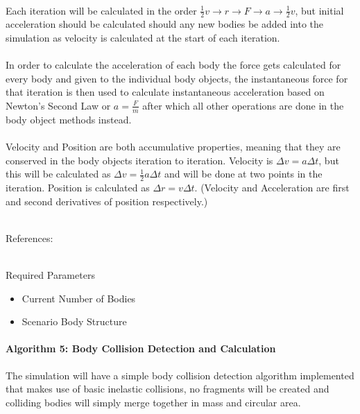 \paragraph{}
Each iteration will be calculated in the order $\frac{1}{2}v \rightarrow r \rightarrow F \rightarrow a \rightarrow \frac{1}{2}v$, but initial acceleration should be calculated should any new bodies be added into the simulation as velocity is calculated at the start of each iteration.

\paragraph{}
In order to calculate the acceleration of each body the force gets calculated for every body and given to the individual body objects, the instantaneous force for that iteration is then used to calculate instantaneous acceleration based on Newton's Second Law or $a=\frac{F}{m}$ after which all other operations are done in the body object methods instead.

\paragraph{}
Velocity and Position are both accumulative properties, meaning that they are conserved in the body objects iteration to iteration. Velocity is $\Delta{v}=a\Delta{t}$, but this will be calculated as $\Delta{v}=\frac{1}{2}a\Delta{t}$ and will be done at two points in the iteration. Position is calculated as $\Delta{r}=v\Delta{t}$. (Velocity and Acceleration are first and second derivatives of position respectively.) \\\

References: \cite{leapfrog} \\\

Required Parameters
\begin{itemize}
\item Current Number of Bodies
\item Scenario Body Structure
\end{itemize}

\paragraph{Algorithm 5: Body Collision Detection and Calculation}
The simulation will have a simple body collision detection algorithm implemented that makes use of basic inelastic collisions, no fragments will be created and colliding bodies will simply merge together in mass and circular area.

